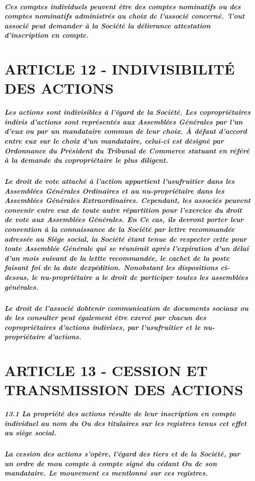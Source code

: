 \documentclass[a4paper, 11pt]{article}
\begin{document}
\subparagraph{
  Ces comptes individuels peuvent être des comptes nominatifs ou des comptes nominatifs administrés au choix dc l'associé concerné. 'l'out associé peut demander à la Société la délivrance attestation d'inscription en compte.
}

\section*{ARTICLE 12 - INDIVISIBILITÉ DES ACTIONS}

\subparagraph{
  Les actions sont indivisibles à l'égard de la Société. Les copropriétaires indivis d'actions sont représentés aux Assemblées Générales par l'un d'eux ou par un mandataire commun de leur choix.  À défaut d'accord entre eux sur le choix d'un mandataire, celui-ci est désigné par Ordonnance du Président du Tribunal de Commerce statuant en référé à la demande du copropriétaire le plus diligent.
}

\subparagraph{
  Le droit de vote attaché à l'action appartient l'usufruitier dans les Assemblées Générales Ordinaires et au nu-propriétaire dans les Assemblées Générales Extraordinaires. Cependant, les associés peuvent convenir entre eux de toute autre répartition pour l'exercice du droit de vote aux Assemblées Générales. En Ce cas, ils devront porter leur convention à la connaissance de la Société par lettre recommandée adressée au Siège social, la Société étant tenue dc respecter cette pour toute Assemblée Générale qui se réunirait après l'expiration d'un délai d'un mois suivant de la lettte recommandée, le cachet de la poste faisant foi de la date dexpédition.  Nonobstant les dispositions ci-dessus, le nu-propriétaire a le droit dc participer toutes les assemblées générales.
}

\subparagraph{
  Le droit de l'associé dobtenir communication de documents sociaux ou de les consulter peut également être exercé par chacun des copropriétaires d'actions indivises, par l'usufruitier et le nu- propriétaire d'actions.
}

\section*{ARTICLE 13 - CESSION ET TRANSMISSION DES ACTIONS}

\subparagraph{
  13.1 La propriété des actions résulte de leur inscription en compte individuel au nom du Ou des titulaires sur les registres tenus cet effet au siège social.
}

\subparagraph{
  La cession des actions s'opère, l'égard des tiers et de la Société, par un ordre de mou compte à compte signé du cédant Ou dc son mandataire. Le mouvement cs mentlonné sur ces registres.
}
\end{document}
